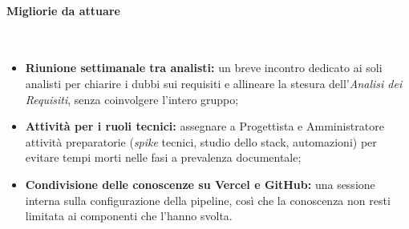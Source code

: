 \paragraph{Migliorie da attuare}~\\[0.15cm]
\begin{itemize}
    \item \textbf{Riunione settimanale tra analisti:} un breve incontro dedicato ai soli analisti per chiarire i dubbi sui requisiti e allineare la stesura dell'\textit{Analisi dei Requisiti}, senza coinvolgere l'intero gruppo;
    \item \textbf{Attività per i ruoli tecnici:} assegnare a Progettista e Amministratore attività preparatorie (\textit{spike} tecnici, studio dello stack, automazioni) per evitare tempi morti nelle fasi a prevalenza documentale;
    \item \textbf{Condivisione delle conoscenze su Vercel e GitHub:} una sessione interna sulla configurazione della pipeline, così che la conoscenza non resti limitata ai componenti che l'hanno svolta.
\end{itemize}
